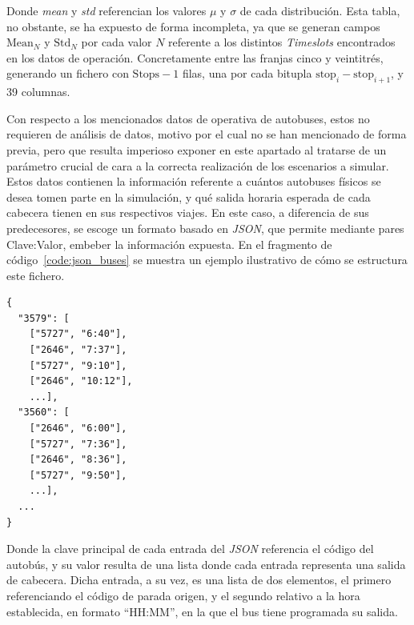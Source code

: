 Donde \textit{mean} y \textit{std} referencian los valores $\mu$ y $\sigma$ de cada distribución. Esta tabla, no obstante, se ha expuesto
de forma incompleta, ya que se generan campos $\text{Mean}_N$ y $\text{Std}_N$ por cada valor $N$ referente a los distintos \textit{Timeslots}
encontrados en los datos de operación. Concretamente entre las franjas cinco y veintitrés, generando un fichero con 
$\text{Stops} - 1$ filas, una por cada bitupla $\text{stop}_i - \text{stop}_{i+1}$, y 39 columnas.

Con respecto a los mencionados datos de operativa de autobuses, estos no requieren de análisis de datos, motivo por el cual
no se han mencionado de forma previa, pero que resulta imperioso exponer en este apartado al tratarse de un parámetro crucial
de cara a la correcta realización de los escenarios a simular. Estos datos contienen la información referente a cuántos
autobuses físicos se desea tomen parte en la simulación, y qué salida horaria esperada de cada cabecera tienen en sus 
respectivos viajes. En este caso, a diferencia de sus predecesores, se escoge un formato basado en \textit{JSON}, que 
permite mediante pares Clave:Valor, embeber la información expuesta. En el fragmento 
de código~\ref{code:json_buses} se muestra un ejemplo ilustrativo de cómo se estructura este fichero.

\begin{lstlisting}[language={}, caption={Fragmento del fichero JSON de dotación 
de autobuses (dos vehículos mostrados).}, 
label={code:json_buses}]
{
  "3579": [
    ["5727", "6:40"],
    ["2646", "7:37"],
    ["5727", "9:10"],
    ["2646", "10:12"],
    ...],
  "3560": [
    ["2646", "6:00"],
    ["5727", "7:36"],
    ["2646", "8:36"],
    ["5727", "9:50"],
    ...],
  ...
}
\end{lstlisting}
\par\vspace{4pt}{\footnotesize Fuente: elaboración propia.}


Donde la clave principal de cada entrada del \textit{JSON} referencia el código del autobús, y su valor resulta de 
una lista donde cada entrada representa una salida de cabecera. Dicha entrada, a su vez, es una lista de dos elementos, el 
primero referenciando el código de parada origen, y el segundo relativo a la hora establecida, en formato \enquote{HH:MM}, 
en la que el bus tiene programada su salida.